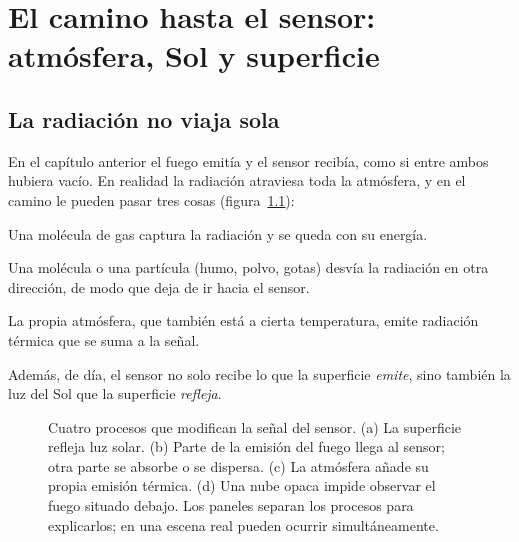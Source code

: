 \chapter{El camino hasta el sensor: atmósfera, Sol y superficie}\label{cap:atmosfera}


\section{La radiación no viaja sola}

En el capítulo anterior el fuego emitía y el sensor recibía, como si entre ambos hubiera vacío.
En realidad la radiación atraviesa toda la atmósfera, y en el camino le pueden pasar tres cosas
(figura~\ref{fig:camino}):

\begin{description}[leftmargin=1.2em]
  \item[Absorción.] Una molécula de gas captura la radiación y se queda con su energía.
  \item[Dispersión.] Una molécula o una partícula (humo, polvo, gotas) desvía la radiación en
  otra dirección, de modo que deja de ir hacia el sensor.
  \item[Emisión.] La propia atmósfera, que también está a cierta temperatura, emite radiación
  térmica que se suma a la señal.
\end{description}

Además, de día, el sensor no solo recibe lo que la superficie \emph{emite}, sino también la luz
del Sol que la superficie \emph{refleja}.

\begin{figure}[ht]
\centering

\caption{Cuatro procesos que modifican la señal del sensor. (a) La superficie refleja luz
solar. (b) Parte de la emisión del fuego llega al sensor; otra parte se absorbe o se dispersa.
(c) La atmósfera añade su propia emisión térmica. (d) Una nube opaca impide observar el
fuego situado debajo. Los paneles separan los procesos para explicarlos; en una escena
real pueden ocurrir simultáneamente.}
\label{fig:camino}
\end{figure}

